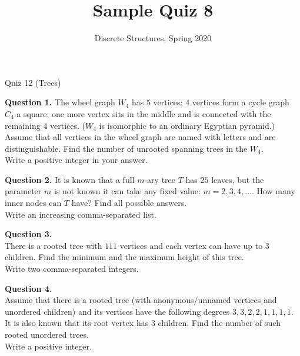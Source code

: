 \documentclass[jou]{apa6}
\title{Sample Quiz 8}
\author{Discrete Structures, Spring 2020}
\affiliation{RBS}
\begin{document}
\thispagestyle{empty}

\twocolumn
{\Large Quiz 12 (Trees)}

{\bf Question 1.} The wheel graph $W_4$ has $5$ vertices: 
$4$ vertices form a cycle graph $C_4$ \textendash{} a square; 
one more vertex sits in the middle and is connected with the remaining $4$ vertices. 
($W_4$ is isomorphic to an ordinary Egyptian pyramid.) 
Assume that all vertices in the wheel graph are named with letters and are distinguishable. 
Find the number of unrooted spanning trees in the $W_4$.\\
Write a positive integer in your answer.

\vspace{10pt}
{\bf Question 2.} It is known that a full $m$-ary tree $T$ has $25$ leaves, but the parameter $m$ is 
not known \textendash{} it can take any fixed value: $m = 2,3,4,\ldots$. 
How many inner nodes can $T$ have? Find all possible answers.\\
Write an increasing comma-separated list.

\vspace{10pt}
{\bf Question 3.}\\ There is a rooted tree with $111$ vertices and each vertex can have up to $3$ children. 
Find the minimum and the maximum height of this tree.\\
Write two comma-separated integers.


\vspace{10pt}
{\bf Question 4.}\\ 
Assume that there is a rooted tree (with anonymous/unnamed vertices and unordered children) and its vertices have 
the following degrees $3, 3, 2, 2, 1, 1, 1, 1$. It is also known that its root vertex has $3$ children. 
Find the number of such rooted unordered trees.\\
Write a positive integer.
\end{document}
